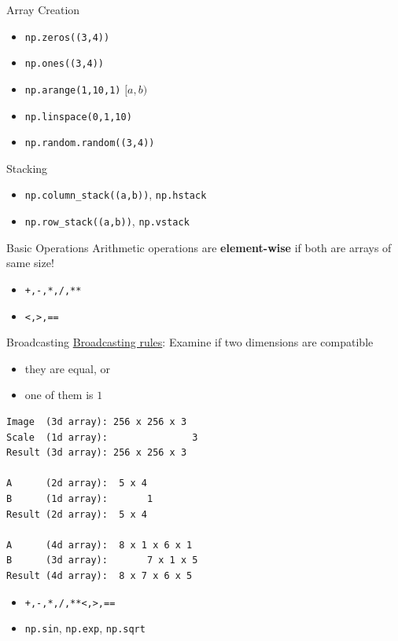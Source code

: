 \documentclass{../TexTemplate/myslide}
\begin{document}
\begin{frame}[fragile]{Array Creation}
\begin{itemize}
	\item \verb'np.zeros((3,4))'
	\item \verb'np.ones((3,4))'
	\item \verb'np.arange(1,10,1)' $[a,b)$
	\item \verb'np.linspace(0,1,10)'
	\item \verb'np.random.random((3,4))'
\end{itemize}
\end{frame}

\begin{frame}[fragile]{Stacking}
\begin{itemize}
	\item \verb'np.column_stack((a,b))', \verb'np.hstack'
	\item \verb'np.row_stack((a,b))', \verb'np.vstack'
\end{itemize}
\end{frame}

\begin{frame}[fragile]{Basic Operations}
Arithmetic operations are \textbf{element-wise} if both are arrays of same size!
\begin{itemize}
	\item \verb'+,-,*,/,**'
	\item \verb'<,>,=='
\end{itemize}
\end{frame}

\begin{frame}[fragile]{Broadcasting}
\href{https://docs.scipy.org/doc/numpy/user/basics.broadcasting.html}{Broadcasting rules}: Examine if two dimensions are compatible
\begin{itemize}
	\item they are equal, or
	\item one of them is $1$
\end{itemize}
\begin{lstlisting}
Image  (3d array): 256 x 256 x 3
Scale  (1d array):               3
Result (3d array): 256 x 256 x 3

A      (2d array):  5 x 4
B      (1d array):       1
Result (2d array):  5 x 4

A      (4d array):  8 x 1 x 6 x 1
B      (3d array):       7 x 1 x 5
Result (4d array):  8 x 7 x 6 x 5
\end{lstlisting}
\begin{itemize}
	\item \verb'+,-,*,/,**'\qquad \verb'<,>,=='
	\item \verb'np.sin', \verb'np.exp', \verb'np.sqrt'
\end{itemize}
\end{frame}
\end{document}
